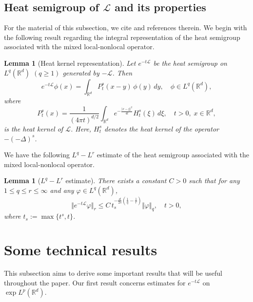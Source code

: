 \documentclass[a4paper,11pt]{amsart}
\numberwithin{equation}{section}
\theoremstyle{plain}
\newtheorem{lemma}[theorem]{Lemma}
\theoremstyle{definition}
\begin{document}
\subsection{Heat semigroup of \texorpdfstring{$\mathcal{L}$}{L} and its properties}  For the material of this subsection, we cite  \cite{Biagi, Castillo3, KFA25} and references therein. We begin with the following result regarding the integral representation of the heat semigroup associated with the mixed local-nonlocal operator. 
\begin{lemma}[Heat kernel representation]
Let $e^{-t\mathcal{L}}$ be the heat semigroup on $L^{q}(\mathbb{R}^{d})$ $(q \geq 1)$ generated by $-\mathcal{L}$. Then
\begin{equation} \label{heatsemimix}
e^{-t\mathcal{L}} \phi(x)=\int_{\mathbb{R}^{d}} P^s_{t}(x-y)\,\phi(y)\,dy, \quad \phi \in L^{q}(\mathbb{R}^{d}),
\end{equation}
where
$$
P^s_{t}(x)=\frac{1}{(4\pi t)^{d/2}}\int_{\mathbb{R}^d} e^{-\frac{|x-\xi|^2}{4t}} H_t^{s}(\xi)\, d\xi, 
\quad t>0,\; x\in\mathbb{R}^d,
$$
is the heat kernel of $\mathcal{L}$. Here, $H_t^{s}$ denotes the heat kernel of the operator $-(-\Delta)^s$.
\end{lemma}
We have the following $L^q-L^r$ estimate of the heat semigroup associated with the mixed local-nonlocal operator.
\begin{lemma}[$L^q-L^r$ estimate] \label{themlplq}
There exists a constant $C>0$ such that for any $1 \leq q \leq r \leq \infty$ and any 
$\varphi \in L^q(\mathbb{R}^d)$,
\begin{equation} \label{pqbound}
\Vert e^{-t \mathcal{L}} \varphi \Vert_{r} \leq C\, t_s^{-\frac{d}{2s}(\frac{1}{q}-\frac{1}{r})}\Vert \varphi \Vert_{q},\quad t>0,
\end{equation}
where $t_s:=\max\{t^s,t\}$.
\end{lemma}
\section{Some technical results}\label{sec3}
This subsection aims to derive some important results that will be useful throughout the paper. Our first result concerns estimates for $e^{-t\mathcal{L}}$ on $\exp L^p(\mathbb{R}^d).$
\end{document}
